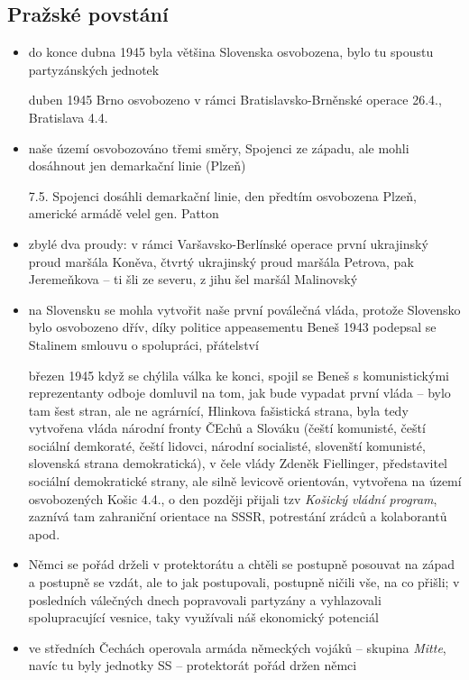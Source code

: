 \documentclass{article}
\begin{document}
\subsection*{Pražské povstání}
\begin{itemize}
    \item do konce dubna 1945 byla většina Slovenska osvobozena, bylo tu spoustu partyzánských jednotek
    \item[duben 1945] Brno osvobozeno v rámci Bratislavsko-Brněnské operace 26.4., Bratislava 4.4.
    \item naše území osvobozováno třemi směry, Spojenci ze západu, ale mohli dosáhnout jen demarkační linie (Plzeň)
    \item[7.5.] Spojenci dosáhli demarkační linie, den předtím osvobozena Plzeň, americké armádě velel gen. Patton
    \item zbylé dva proudy: v rámci Varšavsko-Berlínské operace první ukrajinský proud maršála Koněva, čtvrtý ukrajinský proud maršála Petrova, pak Jeremeňkova -- ti šli ze severu, z jihu šel maršál Malinovský
    \item na Slovensku se mohla vytvořit naše první poválečná vláda, protože Slovensko bylo osvobozeno dřív, díky politice appeasementu Beneš 1943 podepsal se Stalinem smlouvu o spolupráci, přátelství
    \item[březen 1945] když se chýlila válka ke konci, spojil se Beneš s komunistickými reprezentanty odboje domluvil na tom, jak bude vypadat první vláda -- bylo tam šest stran, ale ne agrárnící, Hlinkova fašistická strana, byla tedy vytvořena vláda národní fronty ČEchů a Slováku (čeští komunisté, čeští sociální demkoraté, čeští lidovci, národní socialisté, slovenští komunisté, slovenská strana demokratická), v čele vlády Zdeněk Fiellinger, představitel sociální demokratické strany, ale silně levicově orientován, vytvořena na území osvobozených Košic 4.4., o den později přijali tzv \textit{Košický vládní program}, zaznívá tam zahraniční orientace na SSSR, potrestání zrádců a kolaborantů apod.
    \item Němci se pořád drželi v protektorátu a chtěli se postupně posouvat na západ a postupně se vzdát, ale to jak postupovali, postupně ničili vše, na co přišli; v posledních válečných dnech popravovali partyzány a vyhlazovali spolupracující vesnice, taky využívali náš ekonomický potenciál
    \item ve středních Čechách operovala armáda německých vojáků -- skupina \textit{Mitte}, navíc tu byly jednotky SS -- protektorát pořád držen němci

\end{itemize}
\end{document}

